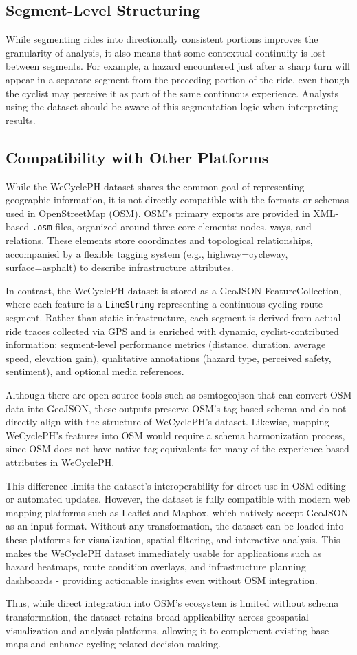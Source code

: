 \subsection{Segment-Level Structuring}

While segmenting rides into directionally consistent portions improves the granularity of analysis, it also means that some contextual continuity is lost between segments. For example, a hazard encountered just after a sharp turn will appear in a separate segment from the preceding portion of the ride, even though the cyclist may perceive it as part of the same continuous experience. Analysts using the dataset should be aware of this segmentation logic when interpreting results.

\subsection{Compatibility with Other Platforms}

While the WeCyclePH dataset shares the common goal of representing geographic information, it is not directly compatible with the formats or schemas used in OpenStreetMap (OSM). OSM's primary exports are provided in XML-based \texttt{.osm} files, organized around three core elements: nodes, ways, and relations. These elements store coordinates and topological relationships, accompanied by a flexible tagging system (e.g., highway=cycleway, surface=asphalt) to describe infrastructure attributes.

In contrast, the WeCyclePH dataset is stored as a GeoJSON FeatureCollection, where each feature is a \texttt{LineString} representing a continuous cycling route segment. Rather than static infrastructure, each segment is derived from actual ride traces collected via GPS and is enriched with dynamic, cyclist-contributed information: segment-level performance metrics (distance, duration, average speed, elevation gain), qualitative annotations (hazard type, perceived safety, sentiment), and optional media references.

Although there are open-source tools such as osmtogeojson that can convert OSM data into GeoJSON, these outputs preserve OSM's tag-based schema and do not directly align with the structure of WeCyclePH's dataset. Likewise, mapping WeCyclePH's features into OSM would require a schema harmonization process, since OSM does not have native tag equivalents for many of the experience-based attributes in WeCyclePH.

This difference limits the dataset's interoperability for direct use in OSM editing or automated updates. However, the dataset is fully compatible with modern web mapping platforms such as Leaflet and Mapbox, which natively accept GeoJSON as an input format. Without any transformation, the dataset can be loaded into these platforms for visualization, spatial filtering, and interactive analysis. This makes the WeCyclePH dataset immediately usable for applications such as hazard heatmaps, route condition overlays, and infrastructure planning dashboards - providing actionable insights even without OSM integration.

Thus, while direct integration into OSM's ecosystem is limited without schema transformation, the dataset retains broad applicability across geospatial visualization and analysis platforms, allowing it to complement existing base maps and enhance cycling-related decision-making.